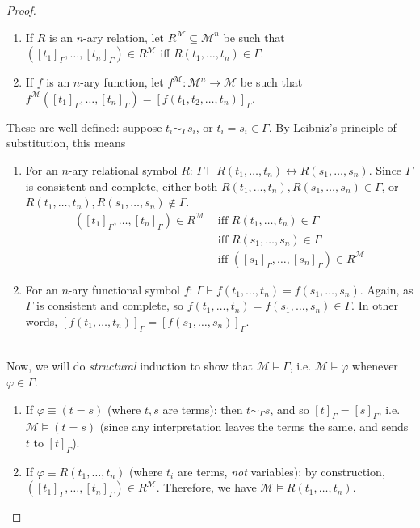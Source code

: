 \documentclass{treatise}
\begin{document}
\begin{shaded}
\begin{proof}
\begin{enumerate}
    \item If $R$ is an $n$-ary relation, let $R^{\mathcal{M}} \subseteq \mathcal{M}^n$ be such that $([t_1]_\Gamma, \hdots, [t_n]_\Gamma) \in R^{\mathcal{M}}$ iff $R(t_1, \hdots, t_n) \in \Gamma$.
    \item If $f$ is an $n$-ary function, let $f^\mathcal{M}: \mathcal{M}^n \to \mathcal{M}$ be such that $f^\mathcal{M}([t_1]_\Gamma, \hdots, [t_n]_\Gamma) = [f(t_1, t_2, \hdots, t_n)]_\Gamma$.
\end{enumerate}
These are well-defined: suppose $t_i \sim_\Gamma s_i$, or $t_i = s_i \in \Gamma$. By Leibniz's principle of substitution, this means
\begin{enumerate}
    \item For an $n$-ary relational symbol $R$: $\Gamma \vdash R(t_1, \hdots, t_n) \leftrightarrow R(s_1, \hdots, s_n)$. Since $\Gamma$ is consistent and complete, either both $R(t_1, \hdots, t_n), R(s_1, \hdots, s_n) \in \Gamma$, or \\ $R(t_1, \hdots, t_n), R(s_1, \hdots, s_n) \notin \Gamma$.
    \begin{align*}
        ([t_1]_\Gamma, \hdots, [t_n]_\Gamma) \in R^{\mathcal{M}} & \mbox{ iff } R(t_1, \hdots, t_n) \in \Gamma
        \\
        & \mbox{ iff } R(s_1, \hdots, s_n) \in \Gamma
        \\
        & \mbox{ iff } ([s_1]_\Gamma, \hdots, [s_n]_\Gamma) \in R^{\mathcal{M}}
    \end{align*}
    \item For an $n$-ary functional symbol $f$: $\Gamma \vdash f(t_1, \hdots, t_n) = f(s_1, \hdots, s_n)$. Again, as $\Gamma$ is consistent and complete, so $f(t_1, \hdots, t_n) = f(s_1, \hdots, s_n) \in \Gamma$. In other words, $[f(t_1, \hdots, t_n)]_\Gamma = [f(s_1, \hdots, s_n)]_\Gamma$.
\end{enumerate}
\ \\
Now, we will do \textit{structural} induction to show that $\mathcal{M} \vDash \Gamma$, i.e. $\mathcal{M} \vDash \varphi$ whenever $\varphi \in \Gamma$.
\begin{enumerate}
    \item If $\varphi \equiv (t = s)$ (where $t,s$ are terms): then $t \sim_\Gamma s$, and so $[t]_\Gamma = [s]_\Gamma$, i.e. $\mathcal{M} \vDash (t = s)$ (since any interpretation leaves the terms the same, and sends $t$ to $[t]_\Gamma$).
    \item If $\varphi \equiv R(t_1, \hdots, t_n)$ (where $t_i$ are terms, \textit{not} variables): by construction, $([t_1]_\Gamma, \hdots, [t_n]_\Gamma) \in R^{\mathcal{M}}$. Therefore, we have $\mathcal{M} \vDash R(t_1, \hdots, t_n)$.

\end{enumerate}
\end{proof}
\end{shaded}
\end{document}
